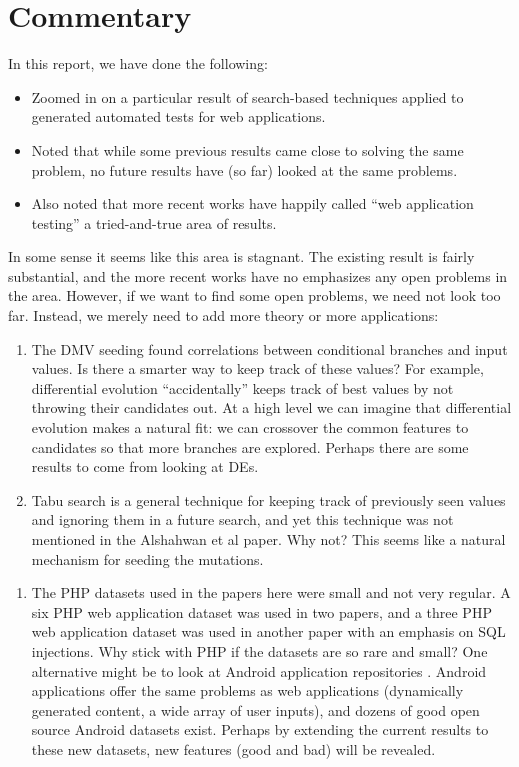 \documentclass{sig-alternate-05-2015}
\begin{document}
\section{Commentary}
In this report, we have done the following:
\begin{itemize}
\item Zoomed in on a particular result of search-based techniques applied to generated automated tests for web applications.
\item Noted that while some previous results came close to solving the same problem, no future results have (so far) looked at the same problems. 
\item Also noted that more recent works have happily called ``web application testing'' a tried-and-true area of results.
\end{itemize}

In some sense it seems like this area is stagnant. The existing result is fairly substantial, and the more recent works have no emphasizes any open problems in the area. However, if we want to find some open problems, we need not look too far. Instead, we merely need to add more theory or more applications:
\begin{enumerate}
\item The DMV seeding found correlations between conditional branches and input values. Is there a smarter way to keep track of these values? For example, differential evolution \cite{storn1996differential} ``accidentally'' keeps track of best values by not throwing their candidates out. At a high level we can imagine that differential evolution makes a natural fit: we can crossover the common features to candidates so that more branches are explored. Perhaps there are some results to come from looking at DEs. 
\item Tabu search \cite{glover1997tabu} is a general technique for keeping track of previously seen values and ignoring them in a future search, and yet this technique was not mentioned in the Alshahwan et al paper. Why not? This seems like a natural mechanism for seeding the mutations. 
\end{enumerate}

\begin{enumerate}
\item The PHP datasets used in the papers here were small and not very regular. A six PHP web application dataset was used in two papers, and a three PHP web application dataset was used in another paper with an emphasis on SQL injections. Why stick with PHP if the datasets are so rare and small? One alternative might be to look at Android application repositories \cite{krutz2015dataset, hamasaki2013who}. Android applications offer the same problems as web applications (dynamically generated content, a wide array of user inputs), and dozens of good open source Android datasets exist. Perhaps by extending the current results to these new datasets, new features (good and bad) will be revealed. 
\end{enumerate}
\end{document}
